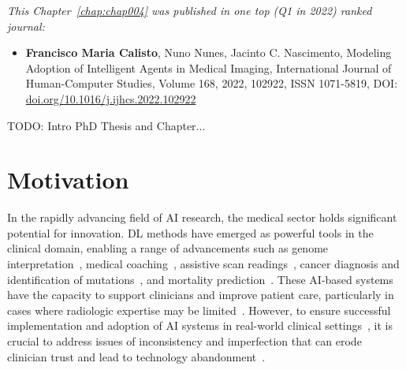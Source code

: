 \clearpage
\label{chap:chap004}

\vspace{0.5mm}

\noindent
{\it This Chapter~\ref{chap:chap004} was published in one top (Q1 in 2022) ranked journal:}

\vspace{0.5mm}

\begin{itemize}
\item {\bf Francisco Maria Calisto}, Nuno Nunes, Jacinto C. Nascimento, Modeling Adoption of Intelligent Agents in Medical Imaging, International Journal of Human-Computer Studies, Volume 168, 2022, 102922, ISSN 1071-5819, DOI: \href{https://doi.org/10.1016/j.ijhcs.2022.102922}{doi.org/10.1016/j.ijhcs.2022.102922}
\end{itemize}

TODO: Intro PhD Thesis and Chapter...

\section{Motivation}
\label{sec:chap004001}

In the rapidly advancing field of \ac{AI} research, the medical sector holds significant potential for innovation.
\ac{DL} methods have emerged as powerful tools in the clinical domain, enabling a range of advancements such as genome interpretation~\cite{sundaram2018predicting}, medical coaching~\cite{bickmore2018patient}, assistive scan readings~\cite{madani2018deep}, cancer diagnosis and identification of mutations~\cite{coudray2018classification}, and mortality prediction~\cite{ahmad2018death}.
These \ac{AI}-based systems have the capacity to support clinicians and improve patient care, particularly in cases where radiologic expertise may be limited~\cite{doi:10.1148/radiol.2020201874, doi:10.1148/radiol.2020190283}.
However, to ensure successful implementation and adoption of \ac{AI} systems in real-world clinical settings~\cite{hoff2015trust, Kocielnik:2019:YAI:3290605.3300641}, it is crucial to address issues of inconsistency and imperfection that can erode clinician trust and lead to technology abandonment~\cite{benrimoh2018aifred, CALISTO2021102607, CALISTO2022102285}.

